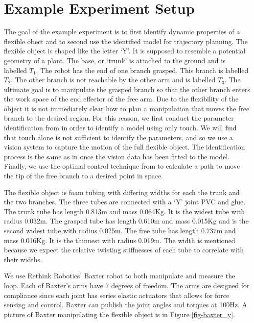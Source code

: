 \documentclass[runningheads,a4paper]{llncs}
\begin{document}
\section{Example Experiment Setup}
\label{sec-exp}
The goal of the example experiment is to first identify dynamic properties of a flexible obect and to second use the identified model for trajectory planning. The flexible object is shaped like the letter `Y'.  It is supposed to resemble a potential geometry of a plant. The base, or `trunk' is attached to the ground and is labelled $T_1$. The robot has the end of one branch grasped. This branch is labelled $T_2$.  The other branch is not reachable by the other arm and is labelled $T_3$. The ultimate goal is to manipulate the grasped branch so that the other branch enters the work space of the end effector of the free arm. Due to the flexibility of the object it is not immediately clear how to plan a manipulation that moves the free branch to the desired region. For this reason, we first conduct the parameter identification from \cite{caldwell_coleman_correll_iros} in order to identify a model using only touch.  We will find that touch alone is not sufficient to identify the parameters, and so we use a vision system to capture the motion of the full flexible object. The identification process is the same as in \cite{caldwell_coleman_correll_iros} once the vision data has been fitted to the model.  Finally, we use the optimal control technique from \cite{hauser} to calculate a path to move the tip of the free branch to a desired point in space.  

The flexible object is foam tubing with differing widths for each the trunk and the two branches. The three tubes are connected with a `Y' joint PVC and glue.  The trunk tube has length 0.813m and mass 0.064Kg. It is the widest tube with radius 0.032m. The grasped tube has length 0.610m and mass 0.015Kg and is the second widest tube with radius 0.025m. The free tube has length 0.737m and mass 0.016Kg. It is the thinnest with radius 0.019m.  The width is mentioned because we expect the relative twisting stiffnesses of each tube to correlate with their widths. 

We use Rethink Robotics' Baxter \cite{guizzo2011rethink} robot to both manipulate and measure the loop.  Each of Baxter's arms have 7 degrees of freedom.  The arms are designed for compliance since each joint has series elastic actuators that allows for force sensing and control.  Baxter can publish the joint angles and torques at 100Hz.  A picture of Baxter manipulating the flexible object is in Figure \ref{fig-baxter_y}. 
\end{document}
